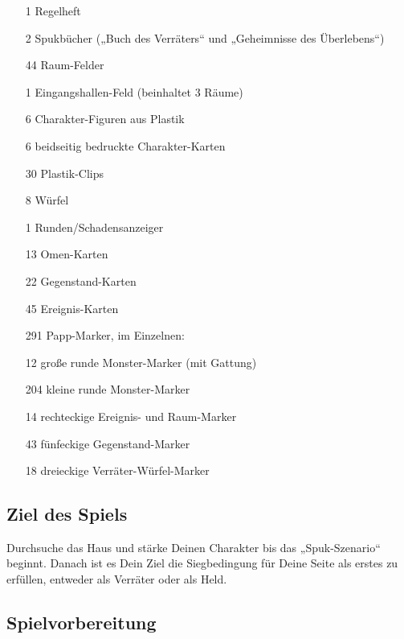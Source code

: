 \begin{itemize}
    \item[1] Regelheft
    \item[2] Spukbücher („Buch des Verräters“ und „Geheimnisse des Überlebens“)
    \item[44] Raum-Felder
    \item[1] Eingangshallen-Feld (beinhaltet 3 Räume)
    \item[6] Charakter-Figuren aus Plastik
    \item[6] beidseitig bedruckte Charakter-Karten
    \item[30] Plastik-Clips
    \item[8] Würfel
    \item[1] Runden/Schadensanzeiger
    \item[13] Omen-Karten
    \item[22] Gegenstand-Karten
    \item[45] Ereignis-Karten
    \item[291] Papp-Marker, im Einzelnen:
    \item[12] große runde Monster-Marker (mit Gattung)
    \item[204] kleine runde Monster-Marker
    \item[14] rechteckige Ereignis- und Raum-Marker
    \item[43] fünfeckige Gegenstand-Marker
    \item[18] dreieckige Verräter-Würfel-Marker
\end{itemize}

\subsection{Ziel des Spiels}

Durchsuche das Haus und stärke Deinen Charakter bis das „Spuk-Szenario“ beginnt. Danach ist es Dein Ziel die Siegbedingung für Deine Seite als erstes zu erfüllen, entweder als Verräter oder als Held.

\subsection{Spielvorbereitung}

